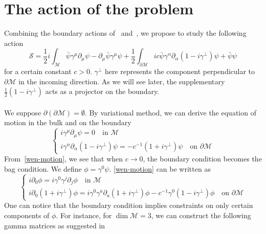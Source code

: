 \section{The action of the problem}
Combining the boundary actions of~\cite{Henningson1998} and~\cite{Contino2005}, we propose to study the following action
\begin{equation}\label{wen-action}
\mathcal{S} = \frac{1}{2}i\int_{\mathcal{M}} \bar{\psi} \gamma^\mu \partial_\mu \psi - \partial_\mu \bar{\psi} \gamma^\mu \psi 
+ \frac{1}{2}\int_{\partial \mathcal{M}} ic \bar{\psi} \gamma^\alpha \partial_\alpha (1 - i \gamma^\bot) \psi
+ \bar{\psi} \psi
\end{equation}
for a certain constant $c >0$. 
$\gamma^\bot$ here represents the component perpendicular to $\partial \mathcal{M}$ in the incoming direction. 
As we will see later, the supplementary $\frac 1 2 (1-i\gamma^\bot)$ acts as a projector on the boundary.
\\\\
We suppose $\partial(\partial \mathcal{M}) = \emptyset$.
By variational method, we can derive the equation of motion in the bulk and on the boundary
\begin{equation}\label{wen-motion}
\begin{cases}
i \gamma^\mu \partial_\mu \psi = 0  \quad \textrm{in $\mathcal{M}$}\\
i \gamma^\alpha \partial_\alpha (1 - i\gamma^\bot) \psi = - c^{-1}(1 + i\gamma^{\bot}) \psi \quad \textrm{on $\partial \mathcal{M}$}
\end{cases}
\end{equation}
From~\cref{wen-motion}, we see that when $c \rightarrow 0$, the boundary condition becomes the bag condition. 
We define $\phi = \gamma^0 \psi$. 
\cref{wen-motion} can be written as 
\begin{equation}\label{wen-maineq}
\begin{cases}
i \partial_0 \phi = i \gamma^0 \gamma^j \partial_j \phi   \quad \textrm{in $\mathcal{M}$}\\
i \partial_0(1 + i\gamma^\bot) \phi = i\gamma^0 \gamma^a \partial_a (1+ i\gamma^\bot)\phi - c^{-1} \gamma^0(1 - i \gamma^{\bot})\phi \quad \textrm{on $\partial \mathcal{M}$}
\end{cases}
\end{equation}
One can notice that the boundary condition implies constraints on only certain components of $\phi$. 
For instance, for $\dim \mathcal{M} = 3$, we can construct the following gamma matrices as suggested in~\cite{Polchinski1998}

